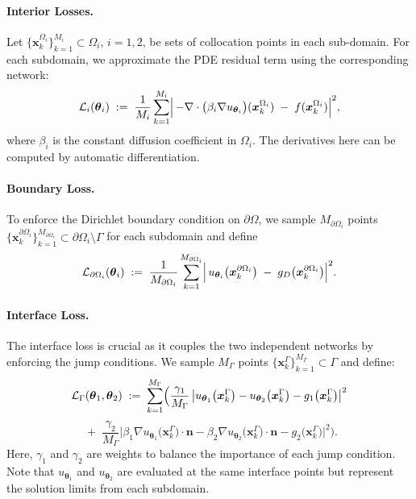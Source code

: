 \documentclass{article}
\begin{document}
\paragraph{Interior Losses.}
Let $\{\boldsymbol{x}_k^{\Omega_i}\}_{k=1}^{M_i} \subset \Omega_i$, $i=1,2$, be sets of collocation points in each sub-domain. For each subdomain, we approximate the PDE residual term using the corresponding network:
\begin{equation}
\mathcal{L}_i(\boldsymbol{\theta}_i)
\;:=\;
\frac{1}{M_i} \sum_{k=1}^{M_i}
\Bigl|\,-\nabla \cdot \bigl(\beta_i \nabla u_{\boldsymbol{\theta}_i}\bigr)(\boldsymbol{x}_k^{\Omega_i})
\;-\;f(\boldsymbol{x}_k^{\Omega_i})\Bigr|^2,
\end{equation}
where $\beta_i$ is the constant diffusion coefficient in $\Omega_i$. The derivatives here can be computed by automatic differentiation.

\paragraph{Boundary Loss.}
To enforce the Dirichlet boundary condition on $\partial \Omega$, we sample $M_{\partial \Omega_i}$ points $\{\boldsymbol{x}_k^{\partial \Omega_i}\}_{k=1}^{M_{\partial \Omega_i}} \subset \partial \Omega_i \setminus \Gamma$ for each subdomain and define
\begin{equation}
\mathcal{L}_{\partial \Omega_i}(\boldsymbol{\theta}_i)
\;:=\;
\frac{1}{M_{\partial \Omega_i}} 
\sum_{k=1}^{M_{\partial \Omega_i}}
\Bigl|\,u_{\boldsymbol{\theta}_i}\bigl(\boldsymbol{x}_k^{\partial \Omega_i}\bigr)
\;-\;
g_D\bigl(\boldsymbol{x}_k^{\partial \Omega_i}\bigr)\Bigr|^2.
\end{equation}

\paragraph{Interface Loss.}
The interface loss is crucial as it couples the two independent networks by enforcing the jump conditions. We sample $M_{\Gamma}$ points 
\(\{\boldsymbol{x}_k^{\Gamma}\}_{k=1}^{M_{\Gamma}} \subset \Gamma\)
and define:
\[
\mathcal{L}_{\Gamma}(\boldsymbol{\theta}_1, \boldsymbol{\theta}_2)
\;:=\;
\sum_{k=1}^{M_{\Gamma}}
\Bigl(\frac{\gamma_1}{M_{\Gamma}} \,\bigl|u_{\boldsymbol{\theta}_1}\bigl(\boldsymbol{x}_k^{\Gamma}\bigr) - u_{\boldsymbol{\theta}_2}\bigl(\boldsymbol{x}_k^{\Gamma}\bigr)
- g_1\bigl(\boldsymbol{x}_k^{\Gamma}\bigr)\bigr|^2
\]
\[
\;+\;
\frac{\gamma_2}{M_{\Gamma}}\bigl|\beta_1\nabla u_{\boldsymbol{\theta}_1}\bigl(\boldsymbol{x}_k^{\Gamma}\bigr) \cdot \boldsymbol{n}
- \beta_2\nabla u_{\boldsymbol{\theta}_2}\bigl(\boldsymbol{x}_k^{\Gamma}\bigr) \cdot \boldsymbol{n}
- g_2\bigl(\boldsymbol{x}_k^{\Gamma}\bigr)\bigr|^2\Bigr).
\]
Here, $\gamma_1$ and $\gamma_2$ are weights to balance the importance of each jump condition. Note that $u_{\boldsymbol{\theta}_1}$ and $u_{\boldsymbol{\theta}_2}$ are evaluated at the same interface points but represent the solution limits from each subdomain.
\end{document}
